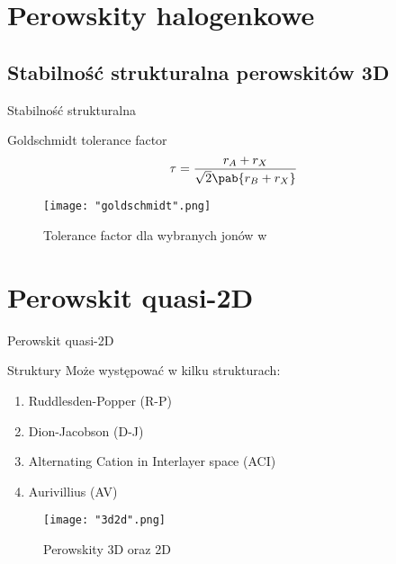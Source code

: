 \documentclass[xcolor]{beamer}
\begin{document}
\section{Perowskity halogenkowe}
\subsection{Stabilność strukturalna perowskitów 3D}
\begin{frame}{Stabilność strukturalna}
\begin{block}{Goldschmidt tolerance factor}
\begin{equation}
\tau = \frac{r_A + r_X}{\sqrt{2}\pab{r_B + r_X}}
\end{equation}
\end{block}
\begin{figure}[H]
\centering
\texttt{[image: "goldschmidt".png]}
\caption{Tolerance factor dla wybranych jonów  w  \cite{miyasaka}}
\end{figure}
\end{frame}

\section{Perowskit quasi-2D}
\begin{frame}{Perowskit quasi-2D \cite{ding}}
\begin{block}{Struktury}
Może występować w kilku strukturach:
\begin{enumerate}
\item Ruddlesden-Popper (R-P)
\item Dion-Jacobson (D-J)
\item Alternating Cation in Interlayer space (ACI)
\item Aurivillius (AV)
\end{enumerate}
\end{block}
\begin{figure}[H]
\centering
\texttt{[image: "3d2d".png]}
\caption{Perowskity 3D oraz 2D \cite{optoelectronic_devices}}
\end{figure}
\end{frame}
\end{document}
